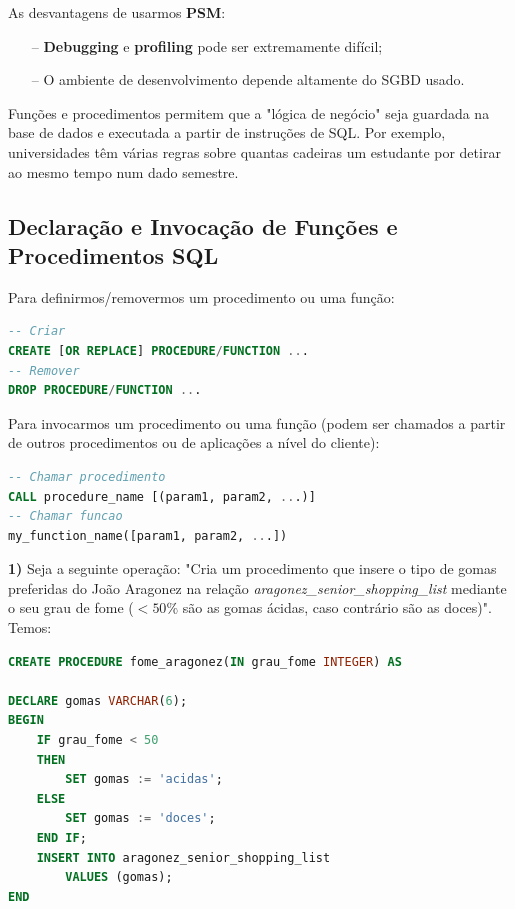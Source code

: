 \documentclass[oneside]{book}
\theoremstyle{definition}
\begin{document}
As desvantagens de usarmos \textbf{PSM}:
\begin{itemize}
    \itemsep0cm
    \item[--] \textbf{Debugging} e \textbf{profiling} pode ser extremamente difícil;
    \item[--] O ambiente de desenvolvimento depende altamente do SGBD usado.
\end{itemize}

Funções e procedimentos permitem que a "lógica de negócio" seja guardada na base de dados e executada a partir de instruções de SQL. Por exemplo, universidades têm várias regras sobre quantas cadeiras um estudante por detirar ao mesmo tempo num dado semestre. 

\subsection{Declaração e Invocação de Funções e Procedimentos SQL}
Para definirmos/removermos um procedimento ou uma função:
\begin{lstlisting}[language=SQL, morekeywords={PROCEDURE, FUNCTION, REPLACE}, framesep=8pt, xleftmargin=40pt, framexleftmargin=40pt, frame=tb, framerule=0pt]
-- Criar
CREATE [OR REPLACE] PROCEDURE/FUNCTION ...
-- Remover
DROP PROCEDURE/FUNCTION ...
\end{lstlisting}

Para invocarmos um procedimento ou uma função (podem ser chamados a partir de outros procedimentos ou de aplicações a nível do cliente):
\begin{lstlisting}[language=SQL, morekeywords={CALL}, framesep=8pt, xleftmargin=40pt, framexleftmargin=40pt, frame=tb, framerule=0pt]
-- Chamar procedimento
CALL procedure_name [(param1, param2, ...)]
-- Chamar funcao
my_function_name([param1, param2, ...])
\end{lstlisting}

\textbf{1)} Seja a seguinte operação: "Cria um procedimento que insere o tipo de gomas preferidas do João Aragonez na relação \textit{aragonez\_senior\_shopping\_list} mediante o seu grau de fome ($<50\%$ são as gomas ácidas, caso contrário são as doces)". Temos:
\begin{lstlisting}[language=SQL, morekeywords={CALL, DECLARE, PROCEDURE, IF}, framesep=8pt, xleftmargin=40pt, framexleftmargin=40pt, frame=tb, framerule=0pt]
CREATE PROCEDURE fome_aragonez(IN grau_fome INTEGER) AS

DECLARE gomas VARCHAR(6);
BEGIN
    IF grau_fome < 50
    THEN
        SET gomas := 'acidas';
    ELSE
        SET gomas := 'doces';
    END IF;
    INSERT INTO aragonez_senior_shopping_list
        VALUES (gomas);
END
\end{lstlisting}
\end{document}
